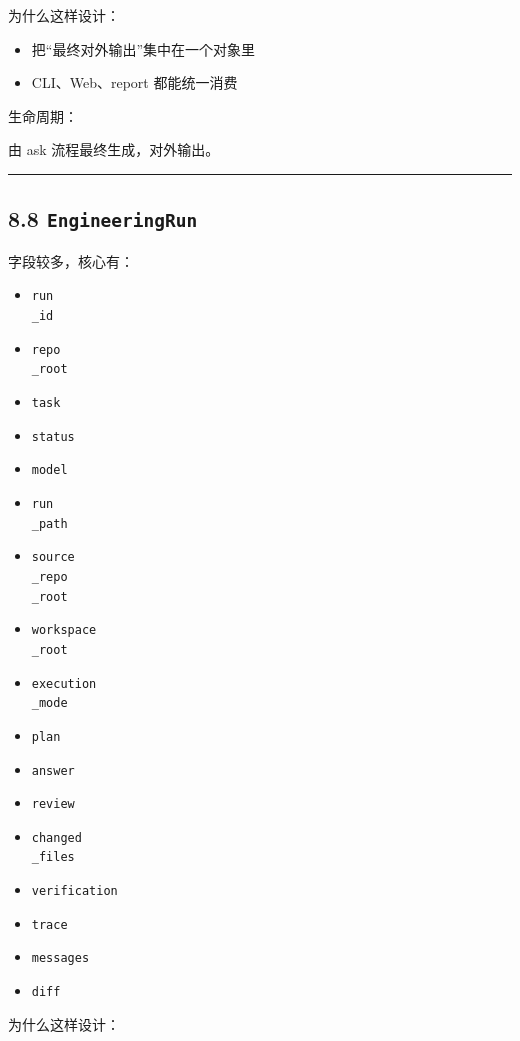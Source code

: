 \documentclass[UTF8,12pt,openany]{ctexbook}
\begin{document}
为什么这样设计：\par

\begin{itemize}
\item 把“最终对外输出”集中在一个对象里
\item CLI、Web、report 都能统一消费
\end{itemize}

生命周期：\par

由 ask 流程最终生成，对外输出。\par

\hrule

\subsection{8.8 \texttt{EngineeringRun}}

字段较多，核心有：\par

\begin{itemize}
\item \texttt{run\\_id}
\item \texttt{repo\\_root}
\item \texttt{task}
\item \texttt{status}
\item \texttt{model}
\item \texttt{run\\_path}
\item \texttt{source\\_repo\\_root}
\item \texttt{workspace\\_root}
\item \texttt{execution\\_mode}
\item \texttt{plan}
\item \texttt{answer}
\item \texttt{review}
\item \texttt{changed\\_files}
\item \texttt{verification}
\item \texttt{trace}
\item \texttt{messages}
\item \texttt{diff}
\end{itemize}

为什么这样设计：\par
\end{document}
